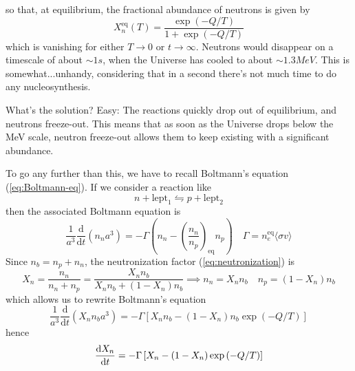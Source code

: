 so that, at equilibrium, the fractional abundance of neutrons is given by 
\begin{equation}
    X_{n}^{\text{eq}}(T) = \frac{\exp(-Q/T)}{1+\exp(-Q/T)}
\end{equation}
which is vanishing for either $T\to 0$ or $t\to\infty$. Neutrons would disappear on a timescale of about $\sim 1\unit{s}$, when the Universe has cooled to about $\sim 1.3\unit{MeV}$. This is somewhat...unhandy, considering that in a second there's not much time to do any nucleosynthesis.
\par What's the solution? Easy: The reactions quickly drop out of equilibrium, and neutrons freeze-out. This means that as soon as the Universe drops below the MeV scale, neutron freeze-out allows them to keep existing with a significant abundance.
\par To go any further than this, we have to recall Boltmann's equation (\ref{eq:Boltmann-eq}). If we consider a reaction like 
\begin{equation}
    n + \text{lept}_{1} \leftrightharpoons p + \text{lept}_{2}
\end{equation}
then the associated Boltmann equation is 
\begin{equation}
    \frac{1}{a^{3}}\frac{\text{d}}{\text{d}t}(n_{n}a^{3}) = -\Gamma\left(n_{n}-\left(\frac{n_{n}}{n_{p}}\right)_{\text{eq}}n_{p}\right) \quad \Gamma = n_{e}^{\text{eq}}\langle \sigma v \rangle
\end{equation}
Since $n_{b} = n_{p}+n_{n}$, the neutronization factor (\ref{eq:neutronization}) is 
\begin{equation}
    X_{n} = \frac{n_{n}}{n_{n}+n_{p}} = \frac{X_{n}n_{b}}{X_{n}n_{b}+ (1-X_{n})n_{b}} \implies n_{n} = X_{n}n_{b} \quad n_{p} = (1-X_{n})n_{b}
\end{equation}
which allows us to rewrite Boltmann's equation 
\begin{equation}
    \frac{1}{a^{3}}\frac{\text{d}}{\text{d}t}(X_{n}n_{b}a^{3}) = -\Gamma \left[X_{n}n_{b} - (1-X_{n})n_{b}\exp\left(-Q/T\right)\right]
\end{equation}
hence 
\begin{equation}
    \frac{\text{d}X_{n}}{\text{d}t} = -\Gamma\left[X_{n}-(1-X_{n})\exp\left(-Q/T\right)\right]
\end{equation}
